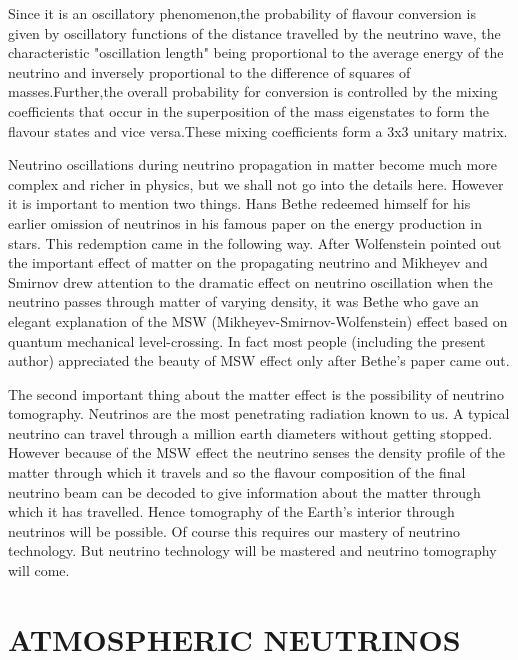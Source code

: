 Since it is an oscillatory phenomenon,the probability of
flavour conversion is given by oscillatory functions of the
distance travelled by the neutrino wave, the characteristic
"oscillation length" being proportional to the average energy
of the neutrino and inversely proportional to the difference
of squares of masses.Further,\break the overall probability for 
conversion is controlled by the mixing coefficients that
occur in the superposition of the mass eigenstates to form
the flavour states and vice versa.These mixing coefficients
form a 3x3 unitary matrix.

Neutrino oscillations during neutrino propagation in matter
become much more complex and richer in physics, but we shall
not go into the details here. However it is important to mention
two things. Hans Bethe redeemed himself for his earlier omission
of neutrinos in his famous paper on the energy production in stars.
This redemption came in the following way. After Wolfenstein
pointed out the important effect of matter on the propagating
neutrino and Mikheyev and Smirnov drew attention to the dramatic
effect on neutrino oscillation when the neutrino passes through
matter of varying  density, it was Bethe who gave an elegant
explanation of the MSW (Mikheyev-Smirnov-Wolfenstein) effect
based on quantum mechanical level-crossing. In fact most people
(including the present author) appreciated the beauty of MSW effect
only after Bethe's paper came out.

The second important thing about the matter effect is the possibility of neutrino
tomography. Neutrinos are the most penetrating radiation known to us. A typical
neutrino can travel through a million earth diameters without getting stopped.
However because of the MSW effect the neutrino senses the density profile
of the matter through which it travels and so the flavour composition
of the final neutrino beam can be decoded to give information about the
matter through which it has travelled. Hence tomography of the Earth's interior
through neutrinos will be possible. Of course this requires 
our mastery of neutrino technology.
But neutrino technology will be mastered and neutrino tomography will come.

\section{ATMOSPHERIC NEUTRINOS}

